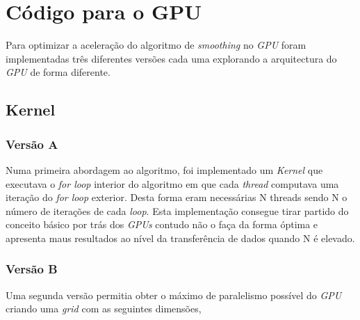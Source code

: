 \chapter{Código para o GPU}

Para optimizar a aceleração do algoritmo de \textit{smoothing} no \textit{GPU} foram implementadas três diferentes versões cada uma explorando a arquitectura do \textit{GPU} de forma diferente.

%

\section{Kernel}
\subsection{Versão A}

Numa primeira abordagem ao algoritmo, foi implementado um \textit{Kernel} que executava o \textit{for loop} interior do algoritmo em que cada \textit{thread} computava uma iteração do \textit{for loop} exterior. Desta forma eram necessárias N threads sendo N o número de iterações de cada \textit{loop}.
Esta implementação consegue tirar partido do conceito básico por trás dos \textit{GPUs} contudo não o faça da forma óptima e apresenta maus resultados ao nível da transferência de dados quando N é elevado. 
\subsection{Versão B}

Uma segunda versão permitia obter o máximo de paralelismo possível do \textit{GPU} criando uma \textit{grid} com as seguintes dimensões,

